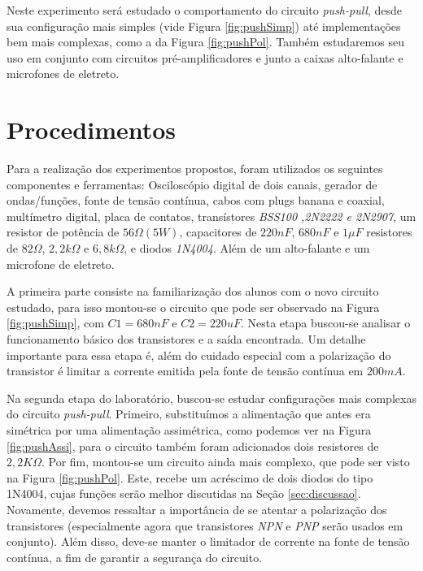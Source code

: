 \documentclass{pack}
\begin{document}
        Neste experimento será estudado o comportamento do circuito \emph{push-pull}, desde sua configuração mais simples (vide Figura \ref{fig:pushSimp}) até implementações bem mais complexas, como a da Figura \ref{fig:pushPol}. Também estudaremos seu uso em conjunto com circuitos pré-amplificadores e junto a caixas alto-falante e microfones de eletreto.
    
    \section{Procedimentos}
        Para a realização dos experimentos propostos, foram utilizados os seguintes componentes e ferramentas: Osciloscópio digital de dois canais, gerador de ondas/funções, fonte de tensão contínua, cabos com plugs banana e coaxial, multímetro digital, placa de contatos, transístores \emph{BSS100 ,2N2222 e 2N2907}, um resistor de potência de $56\Omega (5W)$, capacitores de $220nF$, $680nF$ e $1\mu F$ resistores de $82\Omega$, $2,2k\Omega$ e $6,8k\Omega$, e diodos \emph{1N4004}. Além de um alto-falante e um microfone de eletreto.
    
        A primeira parte consiste na familiarização dos alunos com o novo circuito estudado, para isso montou-se o circuito que pode ser observado na Figura \ref{fig:pushSimp}, com $C1 = 680nF$ e $C2 = 220uF$. Nesta etapa buscou-se analisar o funcionamento básico dos transistores e a saída encontrada. Um detalhe importante para essa etapa é, além do cuidado especial com a polarização do transistor é limitar a corrente emitida pela fonte de tensão contínua em $200mA$.
        
        Na segunda etapa do laboratório, buscou-se estudar configurações mais complexas do circuito \emph{push-pull}. Primeiro, substituímos a alimentação que antes era simétrica por uma alimentação assimétrica, como podemos ver na Figura \ref{fig:pushAssi}, para o circuito também foram adicionados dois resistores de $2,2K\Omega$. Por fim, montou-se um circuito ainda mais complexo, que pode ser visto na Figura \ref{fig:pushPol}. Este, recebe um acréscimo de dois diodos do tipo 1N4004, cujas funções serão melhor discutidas na Seção \ref{sec:discussao}. Novamente, devemos ressaltar a importância de se atentar a polarização dos transistores (especialmente agora que transistores \emph{NPN} e \emph{PNP} serão usados em conjunto). Além disso, deve-se manter o limitador de corrente na fonte de tensão contínua, a fim de garantir a segurança do circuito.
        
\end{document}
